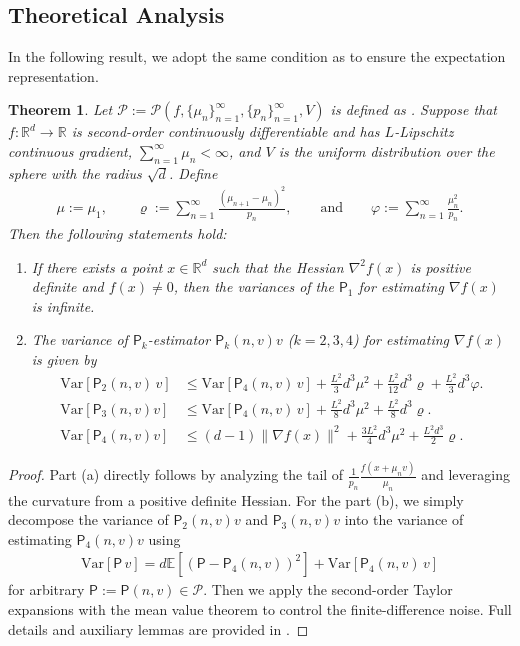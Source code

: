 \documentclass{article}
\newcommand{\Var}{\mathrm{Var}}
\newcommand{\EE}{\mathbb{E}}
\newcommand{\RR}{\mathbb{R}}
\theoremstyle{definition}
\theoremstyle{plain}
\newtheorem{theorem}[definition]{Theorem}
\theoremstyle{remark}
\newcommand{\sfP}{\mathsf{P}}
\begin{document}
\subsection{Theoretical Analysis}
In the following result, we adopt the same condition as  to ensure the expectation representation. 
\begin{theorem}\label{thm:variance}
Let $\mathscr{P}:=\mathscr{P}(f, \{ \mu_n\}_{n=1}^\infty, \{ p_n\}_{n=1}^\infty,V)$ is defined as . Suppose that $f:\RR^d \to \RR$ is second-order continuously differentiable and has $L$-Lipschitz continuous gradient, $\sum_{n=1}^\infty \mu_n < \infty$, and $V$ is the uniform distribution over the  sphere with the radius $\sqrt{d}$. Define 
\begin{align*}
    \mu:=\mu_1, \qquad\varrho:= \sum_{n=1}^\infty \frac{(\mu_{n+1} - \mu_{n})^2}{p_n}, \qquad \text{and} \qquad \varphi:=\sum_{n=1}^\infty  \frac{\mu_{n}^2}{p_n}.
\end{align*}
Then the following statements hold:
    \begin{enumerate}[label=(\alph*)]
        \item If there exists a point $x\in \RR^d$ such that the Hessian $\nabla^2 f(x)$ is positive definite and $f(x)\neq 0$, then the variances of the $\sfP_1$ for estimating $\nabla f(x)$ is infinite.  
        \item The variance of $\sfP_k$-estimator $\sfP_k(n,v) v$ ($k=2,3,4$) for estimating $\nabla f(x)$ is given by
        \begin{align*}
        \Var[\sfP_2(n,v) \, v ]  
    &\leq  \Var[\sfP_4(n,v)\, v] + \frac{L^2 }{3} d^3\mu^2 + \frac{L^2}{12}  d^3  \varrho  + \frac{L^2}{3} d^3   \varphi.\\
        \Var[\sfP_3(n,v) v] &\leq \Var[\sfP_4(n,v)\, v] + \frac{L^2 }{8} d^3\mu^2 + \frac{L^2}{8}  d^3 \varrho. \\ 
            \Var[\sfP_4(n,v) v] &\leq  (d-1) \| \nabla f(x) \|^2 +  \frac{3L^2}{4} d^3 \mu^2  +  \frac{L^2 d^3}{2}  \varrho.
        \end{align*} 
    \end{enumerate}
\end{theorem}
\begin{proof}
    Part (a) directly follows by analyzing the tail of $\frac{1}{p_n}\frac{f(x+\mu_n v)}{\mu_n}$  and leveraging the curvature from a positive definite Hessian. For the part (b), we simply decompose the variance of $\sfP_2(n,v) v$ and $\sfP_3(n,v) v$ into the variance of estimating $\sfP_4(n,v) v$ using 
\begin{align*}
    \Var[\sfP \, v ]  =     d\EE[(\sfP- \sfP_4(n,v))^2  ] + \Var[\sfP_4(n,v)\, v]
\end{align*}
for arbitrary $\sfP:=\sfP(n,v)\in \mathscr{P}$. 
    Then we apply the second-order Taylor expansions with the mean value theorem to control the finite-difference noise.  Full details and auxiliary lemmas are provided in . 
\end{proof}  
 
\end{document}
